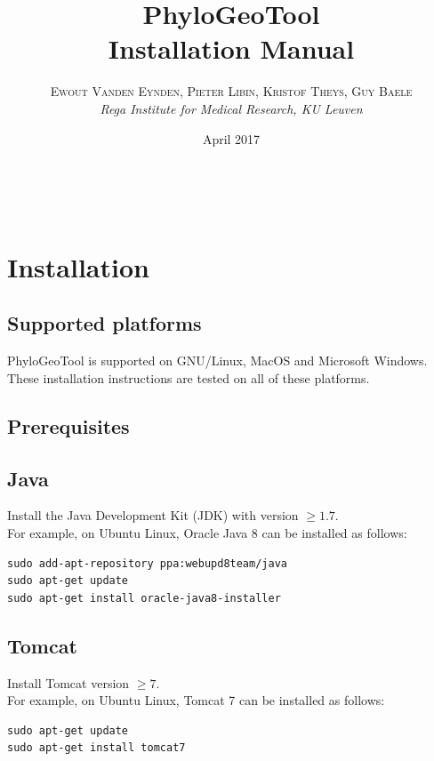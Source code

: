 \documentclass[a4paper, 11pt]{article} %
\title{\textbf{PhyloGeoTool}\\ %
Installation Manual} %
\author{\textsc{Ewout Vanden Eynden, Pieter Libin, Kristof Theys, Guy Baele} %
\\{\textit{Rega Institute for Medical Research, KU Leuven}}} %
\date{April 2017} %
\makeatletter
\renewcommand{\maketitle}{ %
\begin{flushright} %
{\LARGE\@title} %

\vspace{50pt} %

{\large\@author} %
\\\@date %

\vspace{40pt} %
\end{flushright}
}
\makeatother
\begin{document}
\maketitle %

\vspace{30pt} %

\tableofcontents
\newpage


\section{Installation}

\subsection{Supported platforms}
PhyloGeoTool is supported on GNU/Linux, MacOS and Microsoft Windows. These installation instructions are tested on all of these platforms.

\subsection{Prerequisites}
\subsection*{Java}
Install the Java Development Kit (JDK) with version $\geq 1.7$.\\

\noindent For example, on Ubuntu Linux, Oracle Java 8 can be installed as follows:
\begin{verbatim} 
sudo add-apt-repository ppa:webupd8team/java
sudo apt-get update
sudo apt-get install oracle-java8-installer
\end{verbatim}

\subsection*{Tomcat}
Install Tomcat version $\geq 7$.\\

\noindent For example, on Ubuntu Linux, Tomcat 7 can be installed as follows:
\begin{verbatim}
sudo apt-get update
sudo apt-get install tomcat7
\end{verbatim}
\end{document}
